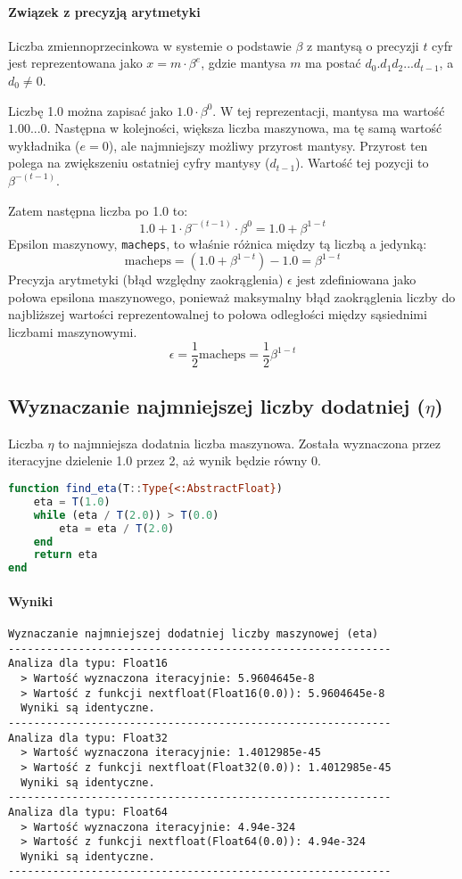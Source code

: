 \documentclass[a4paper,12pt]{article}
\begin{document}
\paragraph{Związek z precyzją arytmetyki}
Liczba zmiennoprzecinkowa w systemie o podstawie $\beta$ z mantysą o precyzji $t$ cyfr jest reprezentowana jako $x = m \cdot \beta^e$, gdzie mantysa $m$ ma postać $d_0.d_1d_2...d_{t-1}$, a $d_0 \neq 0$.

Liczbę 1.0 można zapisać jako $1.0 \cdot \beta^0$. W tej reprezentacji, mantysa ma wartość $1.00...0$.
Następna w kolejności, większa liczba maszynowa, ma tę samą wartość wykładnika ($e=0$), ale najmniejszy możliwy przyrost mantysy. Przyrost ten polega na zwiększeniu ostatniej cyfry mantysy ($d_{t-1}$). Wartość tej pozycji to $\beta^{-(t-1)}$.

Zatem następna liczba po 1.0 to:
\[
1.0 + 1 \cdot \beta^{-(t-1)} \cdot \beta^0 = 1.0 + \beta^{1-t}
\]
Epsilon maszynowy, \texttt{macheps}, to właśnie różnica między tą liczbą a jedynką:
\[
\mathrm{macheps} = (1.0 + \beta^{1-t}) - 1.0 = \beta^{1-t}
\]
Precyzja arytmetyki (błąd względny zaokrąglenia) $\epsilon$ jest zdefiniowana jako połowa epsilona maszynowego, ponieważ maksymalny błąd zaokrąglenia liczby do najbliższej wartości reprezentowalnej to połowa odległości między sąsiednimi liczbami maszynowymi.
\[
\epsilon = \frac{1}{2} \mathrm{macheps} = \frac{1}{2}\beta^{1-t}
\]

\subsection{ Wyznaczanie najmniejszej liczby dodatniej ($\eta$)}

Liczba $\eta$ to najmniejsza dodatnia liczba maszynowa. Została wyznaczona przez iteracyjne dzielenie 1.0 przez 2, aż wynik będzie równy 0.

\begin{lstlisting}[language=Julia]
function find_eta(T::Type{<:AbstractFloat})
    eta = T(1.0)
    while (eta / T(2.0)) > T(0.0)
        eta = eta / T(2.0)
    end
    return eta
end
\end{lstlisting}

\paragraph{Wyniki}
\begin{verbatim}
Wyznaczanie najmniejszej dodatniej liczby maszynowej (eta)
------------------------------------------------------------
Analiza dla typu: Float16
  > Wartość wyznaczona iteracyjnie: 5.9604645e-8
  > Wartość z funkcji nextfloat(Float16(0.0)): 5.9604645e-8
  Wyniki są identyczne.
------------------------------------------------------------
Analiza dla typu: Float32
  > Wartość wyznaczona iteracyjnie: 1.4012985e-45
  > Wartość z funkcji nextfloat(Float32(0.0)): 1.4012985e-45
  Wyniki są identyczne.
------------------------------------------------------------
Analiza dla typu: Float64
  > Wartość wyznaczona iteracyjnie: 4.94e-324
  > Wartość z funkcji nextfloat(Float64(0.0)): 4.94e-324
  Wyniki są identyczne.
------------------------------------------------------------
\end{verbatim}
\end{document}
